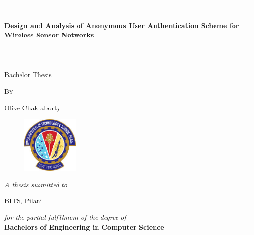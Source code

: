 \documentclass[a4paper,12pt]{report}
\newcommand{\HRule}{\rule{\linewidth}{0.5mm}}
\begin{document}
\begin{titlepage}
\begin{center}
\HRule \\[0.4cm]
{\huge \bfseries \textbf{Design and Analysis of Anonymous User Authentication Scheme for Wireless Sensor Networks}  \\[0.4cm] }
\HRule \\[1cm]
\end{center}
\vspace{0.2cm}
\begin{center}
{\large{Bachelor Thesis}}
\end{center}
\vspace{0.25cm}
\begin{center}
{\large {\textsc{By}}}
\end{center}
\vspace{0.35cm}
\begin{center}
{\large{Olive Chakraborty}}
\end{center}
\vspace{0.25cm}

\begin{figure}[h]
    \centering
        \includegraphics[width=0.25\textwidth]{pilani}
\end{figure}

\vspace{0.5cm}

\begin{center}
{\textit{\Large{A thesis submitted to}}}\\
\end{center}
\vspace{0.25cm}
\begin{center}
{\Large{BITS, Pilani}}\\
\end{center}

\vspace{0.35cm}

\begin{center}
\textit{\large {for the partial fulfillment of the degree of}}\\
\vspace{0.8cm}
 \textbf{\Large{Bachelors of Engineering in Computer Science}}\\
\end{center}


\end{titlepage}
\end{document}
